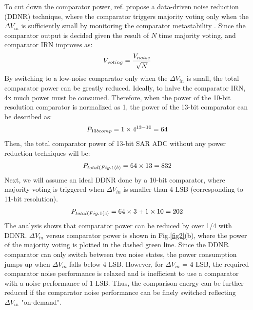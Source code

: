 \documentclass[journal]{IEEEtran}
\begin{document}
To cut down the comparator power, ref.\cite{harpe201310b} propose a data-driven noise reduction (DDNR) technique, where the comparator triggers majority voting only when the $\Delta V_{in}$ is sufficiently small by monitoring the comparator metastability \cite{shikata20120}. Since the comparator output is decided given the result of $N$ time majority voting, and comparator IRN improves as:
\begin{eqnarray}
    \centering
    V_{voting} = \frac{V_{noise}}{\sqrt{N}}
    \label{voting}
\end{eqnarray}
By switching to a low-noise comparator only when the $\Delta V_{in}$ is small, the total comparator power can be greatly reduced.
Ideally, to halve the comparator IRN, 4x much power must be consumed. Therefore, when the power of the 10-bit resolution comparator is normalized as 1, the power of the 13-bit comparator can be described as:
\begin{eqnarray}
    \centering
    P_{13bcomp} = 1 \times 4^{13-10} = 64
    \label{13b}
\end{eqnarray}
Then, the total comparator power of 13-bit SAR ADC without any power reduction techniques will be:
\begin{eqnarray}
    \centering
    P_{total(Fig.1(b)} = 64 \times 13 = 832
    \label{sar13b}
\end{eqnarray}
Next, we will assume an ideal DDNR done by a 10-bit comparator, where majority voting is triggered when $\Delta V_{in}$ is smaller than 4 LSB (corresponding to 11-bit resolution).
\begin{eqnarray}
    \centering
    P_{total(Fig.1(c)} = 64 \times 3 + 1 \times 10 = 202
    \label{ddnr}
\end{eqnarray}
The analysis shows that comparator power can be reduced by over 1/4 with DDNR. $\Delta V_{in}$ versus comparator power is shown in Fig.\ref{fig2}(b), where the power of the majority voting is plotted in the dashed green line. 
Since the DDNR comparator can only switch between two noise states, the power consumption jumps up when $\Delta V_{in}$ falls below 4 LSB. 
However, for $\Delta V_{in}$ = 4 LSB, the required comparator noise performance is relaxed and is inefficient to use a comparator with a noise performance of 1 LSB.
Thus, the comparison energy can be further reduced if the comparator noise performance can be finely switched reflecting $\Delta V_{in}$ "on-demand".
\end{document}
